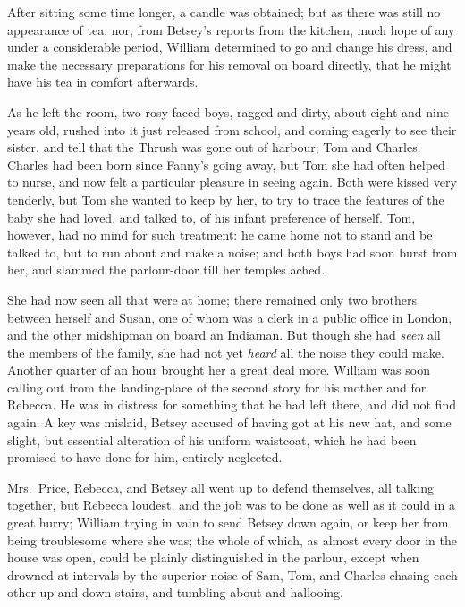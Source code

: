 \documentclass{article}
\begin{document}
After sitting some time longer, a candle was obtained;
but as there was still no appearance of tea, nor, from
Betsey's reports from the kitchen, much hope of any under
a considerable period, William determined to go and change
his dress, and make the necessary preparations for his removal
on board directly, that he might have his tea in comfort
afterwards.

As he left the room, two rosy-faced boys, ragged and dirty,
about eight and nine years old, rushed into it just released
from school, and coming eagerly to see their sister,
and tell that the Thrush was gone out of harbour;
Tom and Charles.  Charles had been born since Fanny's
going away, but Tom she had often helped to nurse,
and now felt a particular pleasure in seeing again.
Both were kissed very tenderly, but Tom she wanted
to keep by her, to try to trace the features of the baby
she had loved, and talked to, of his infant preference
of herself.  Tom, however, had no mind for such treatment:
he came home not to stand and be talked to, but to run about
and make a noise; and both boys had soon burst from her,
and slammed the parlour-door till her temples ached.

She had now seen all that were at home; there remained
only two brothers between herself and Susan,
one of whom was a clerk in a public office in London,
and the other midshipman on board an Indiaman.
But though she had \emph{seen} all the members of the family,
she had not yet \emph{heard} all the noise they could make.
Another quarter of an hour brought her a great deal more.
William was soon calling out from the landing-place
of the second story for his mother and for Rebecca.
He was in distress for something that he had left there,
and did not find again.  A key was mislaid, Betsey accused
of having got at his new hat, and some slight, but essential
alteration of his uniform waistcoat, which he had been
promised to have done for him, entirely neglected.

Mrs.\ Price, Rebecca, and Betsey all went up to defend themselves,
all talking together, but Rebecca loudest, and the job
was to be done as well as it could in a great hurry;
William trying in vain to send Betsey down again, or keep
her from being troublesome where she was; the whole of which,
as almost every door in the house was open, could be plainly
distinguished in the parlour, except when drowned at intervals
by the superior noise of Sam, Tom, and Charles chasing
each other up and down stairs, and tumbling about and hallooing.
\end{document}
